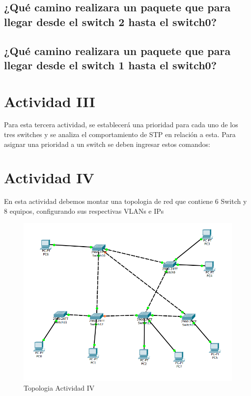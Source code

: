 \documentclass[spanish]{udpreport}
\begin{document}
\subsection{¿Qué camino realizara un paquete que para llegar desde el switch
2 hasta el switch0?}

\subsection{¿Qué camino realizara un paquete que para llegar desde el switch
1 hasta el switch0?}



\section{Actividad III}
Para esta tercera actividad, se establecerá una prioridad para cada uno de los tres switches y se analiza el comportamiento de STP en relación a esta. Para asignar una prioridad a un switch se deben ingresar estos comandos:

\section{Actividad IV}

En esta actividad debemos montar una topologia de red que contiene 6 Switch y 8 equipos, configurando sus respectivas VLANs e IPs

\begin{figure}[H]
	\caption{Topologia Actividad IV}
	\label{fig:Figura 2.4}
	\centering
	\includegraphics[scale=.6, bb=0 0 30 30]{imagenes/A4e.png}
	\linebreak
\end{figure}
\end{document}
